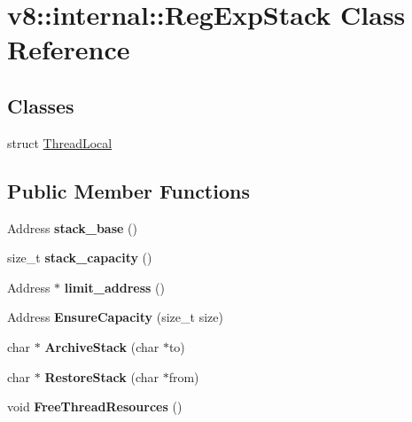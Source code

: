 \hypertarget{classv8_1_1internal_1_1_reg_exp_stack}{}\section{v8\+:\+:internal\+:\+:Reg\+Exp\+Stack Class Reference}
\label{classv8_1_1internal_1_1_reg_exp_stack}
\subsection*{Classes}
\begin{DoxyCompactItemize}
\item 
struct \hyperlink{structv8_1_1internal_1_1_reg_exp_stack_1_1_thread_local}{Thread\+Local}
\end{DoxyCompactItemize}
\subsection*{Public Member Functions}
\begin{DoxyCompactItemize}
\item 
Address {\bfseries stack\+\_\+base} ()\hypertarget{classv8_1_1internal_1_1_reg_exp_stack_a59b6a5f5458cf12bf5d94455e65a1c69}{}\label{classv8_1_1internal_1_1_reg_exp_stack_a59b6a5f5458cf12bf5d94455e65a1c69}

\item 
size\+\_\+t {\bfseries stack\+\_\+capacity} ()\hypertarget{classv8_1_1internal_1_1_reg_exp_stack_a9ea506c5a110c559c7ecd5dd3f0bedd0}{}\label{classv8_1_1internal_1_1_reg_exp_stack_a9ea506c5a110c559c7ecd5dd3f0bedd0}

\item 
Address $\ast$ {\bfseries limit\+\_\+address} ()\hypertarget{classv8_1_1internal_1_1_reg_exp_stack_ae826479d94857331ae3c5358f9c54054}{}\label{classv8_1_1internal_1_1_reg_exp_stack_ae826479d94857331ae3c5358f9c54054}

\item 
Address {\bfseries Ensure\+Capacity} (size\+\_\+t size)\hypertarget{classv8_1_1internal_1_1_reg_exp_stack_a8ad338369295924ce1a6cc4777da4b7f}{}\label{classv8_1_1internal_1_1_reg_exp_stack_a8ad338369295924ce1a6cc4777da4b7f}

\item 
char $\ast$ {\bfseries Archive\+Stack} (char $\ast$to)\hypertarget{classv8_1_1internal_1_1_reg_exp_stack_a360cf9b3de09e77f5f5b49beadd21c09}{}\label{classv8_1_1internal_1_1_reg_exp_stack_a360cf9b3de09e77f5f5b49beadd21c09}

\item 
char $\ast$ {\bfseries Restore\+Stack} (char $\ast$from)\hypertarget{classv8_1_1internal_1_1_reg_exp_stack_a9fcb45f19c31a1675f3d31640e584ea8}{}\label{classv8_1_1internal_1_1_reg_exp_stack_a9fcb45f19c31a1675f3d31640e584ea8}

\item 
void {\bfseries Free\+Thread\+Resources} ()\hypertarget{classv8_1_1internal_1_1_reg_exp_stack_a66f53e7acd3d11da2928267ccaeea024}{}\label{classv8_1_1internal_1_1_reg_exp_stack_a66f53e7acd3d11da2928267ccaeea024}

\end{DoxyCompactItemize}
